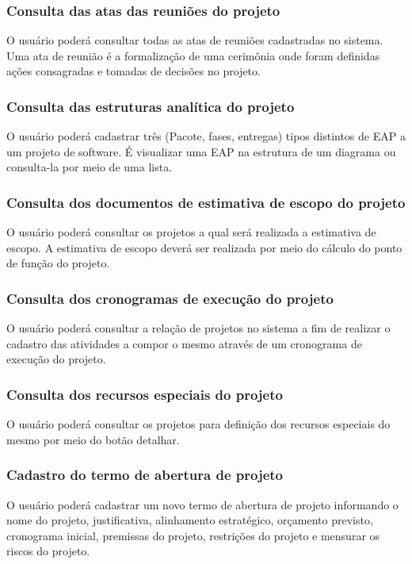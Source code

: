 \documentclass{acm_proc_article-sp}
\begin{document}
\subsubsection{Consulta das atas das reuniões do projeto}
O usuário poderá consultar todas as atas de reuniões cadastradas no sistema. Uma ata de reunião é a formalização de uma cerimônia onde foram definidas ações consagradas e tomadas de decisões no projeto.

\subsubsection{Consulta das estruturas analítica do projeto}
O usuário poderá cadastrar três (Pacote, fases, entregas) tipos distintos de EAP a um projeto de software. É visualizar uma EAP na estrutura de um diagrama ou consulta-la por meio de uma lista. 

\subsubsection{Consulta dos documentos de estimativa de escopo do projeto}
O usuário poderá consultar os projetos a qual será realizada a estimativa de escopo. A estimativa de escopo deverá ser realizada por meio do cálculo do ponto de função do projeto.

\subsubsection{Consulta dos cronogramas de execução do projeto}
O usuário poderá consultar a relação de projetos no sistema a fim de realizar o cadastro das atividades a compor o mesmo através de um cronograma de execução do projeto.

\subsubsection{Consulta dos recursos especiais do projeto}
O usuário poderá consultar os projetos para definição dos recursos especiais do mesmo por meio do botão detalhar.

\subsubsection{Cadastro do termo de abertura de projeto}
O usuário poderá cadastrar um novo termo de abertura de projeto informando o nome do projeto, justificativa, alinhamento estratégico, orçamento previsto, cronograma inicial, premissas do projeto, restrições do projeto e mensurar os riscos do projeto. 
\end{document}
